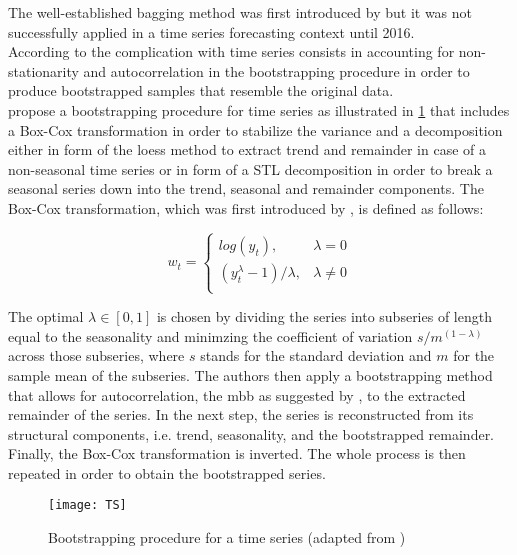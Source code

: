 \noindent The well-established bagging method was first introduced by \textcite{breiman1996} but it was not successfully applied in a time series forecasting context until 2016.\\
According to \textcite{petropoulos2018} the complication with time series consists in accounting for non-stationarity and autocorrelation in the bootstrapping procedure in order to produce bootstrapped samples that resemble the original data.\\
\textcite{bergmeir} propose a bootstrapping procedure for time series as illustrated in \cref{fig: Bootstrapping procedure TS} that includes a Box-Cox transformation in order to stabilize the variance and a decomposition either in form of the loess method to extract trend and remainder in case of a non-seasonal time series or in form of a STL decomposition in order to break a seasonal series down into the trend, seasonal and remainder components. 
The Box-Cox transformation, which was first introduced by \textcite{box1964}, is defined as follows:

\begin{equation} \label{eq: box cox}
	w_{t} =
	\begin{cases}
	log(y_{t}), & \lambda=0 \\
	(y_{t}^\lambda-1)/\lambda, & \lambda \neq0\\
	\end{cases}
\end{equation}

The optimal $\lambda \in [0,1]$ is chosen by dividing the series into subseries of length equal to the seasonality and minimzing the coefficient of variation $s/m^{(1-\lambda)}$ across those subseries, where $s$ stands for the standard deviation and $m$ for the sample mean of the subseries.
The authors then apply a bootstrapping method that allows for autocorrelation, the \acrfull{mbb} as suggested by \textcite{kunsch1989}, to the extracted remainder of the series. In the next step, the series is reconstructed from its structural components, i.e. trend, seasonality, and the bootstrapped remainder. Finally, the Box-Cox transformation is inverted. The whole process is then repeated in order to obtain the bootstrapped series.\\ 


\begin{figure} [h]
\centering
\texttt{[image: TS]}
\caption{Bootstrapping procedure for a time series (adapted from \textcite{petropoulos2018})}
\label{fig: Bootstrapping procedure TS}
\end{figure}


